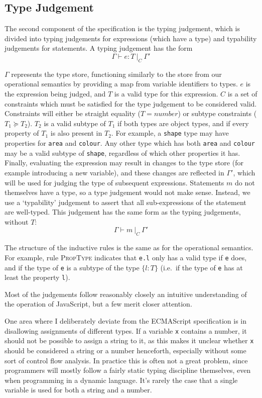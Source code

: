 \documentclass[12pt,a4paper,twoside,openright]{report}
\newcommand*{\js}{\texttt}
\begin{document}
\subsection{Type Judgement}
The second component of the specification is the typing judgement, which is
divided into typing judgements for expressions (which have a type) and
typability judgements for statements. A typing judgement has the form 
$$\Gamma\vdash e : T\ |_C\ \Gamma'$$

$\Gamma$ represents the type store, functioning similarly to the store from our
operational semantics by providing a map from variable identifiers to types.
$e$ is the expression being judged, and $T$ is a valid type for this
expression. $C$ is a set of constraints which must be satisfied for the type
judgement to be considered valid. Constraints will either be straight equality
($T = number$) or subtype constraints ($T_1 \succeq T_2$). $T_2$ is a valid
subtype of $T_1$ if both types are object types, and if every property of $T_1$
is also present in $T_2$. For example, a \js{shape} type may have
properties for \js{area} and \js{colour}. Any other type which has both
\js{area} and \js{colour} may be a valid subtype of \js{shape},
regardless of which other properties it has. Finally, evaluating the expression
may result in changes to the type store (for example introducing a new
variable), and these changes are reflected in $\Gamma'$, which will be used for
judging the type of subsequent expressions. Statements $m$ do not themselves
have a type, so a type judgement would not make sense. Instead, we use a
`typability' judgement to assert that all sub-expressions of the statement are
well-typed. This judgement has the same form as the typing judgements, without
$T$: 
$$\Gamma \vdash m\ |_C\ \Gamma'$$

The structure of the inductive rules is the same as for the operational
semantics. For example, rule \textsc{PropType} indicates that \js{e.l} only
has a valid type if \js{e} does, and if the type of \js{e} is a subtype
of the type $\{l: T\}$ (i.e.~if the type of \js{e} has at least the property
\js{l}).

Most of the judgements follow reasonably closely an intuitive understanding of
the operation of JavaScript, but a few merit closer attention.

One area where I deliberately deviate from the ECMAScript specification is in
disallowing assignments of different types. If a variable \js{x} contains a
number, it should not be possible to assign a string to it, as this makes it
unclear whether \js{x} should be considered a string or a number
henceforth, especially without some sort of control flow analysis. In practice
this is often not a great problem, since programmers will mostly follow a
fairly static typing discipline themselves, even when programming in a dynamic
language. It's rarely the case that a single variable is used for both a string
and a number.
\end{document}
